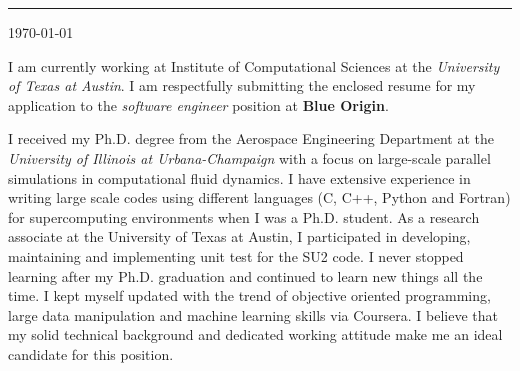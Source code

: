 \documentclass[11pt]{article}
\newcommand{\company}{\textbf{Blue Origin}}
\newcommand{\position}{\textit{software engineer }}
\begin{document}
\thispagestyle{empty}
%
%
\begin{minipage}[t]{0.45\textwidth}
\vspace{-0.5truein}
\end{minipage} 



%
%
\vspace{0.2truein}
\rule[0.8em]{\textwidth}{1.0pt} 

\noindent
\begin{minipage}[b]{0.7\textwidth}
\vspace{-0.35truein}
\noindent
\small
\begin{tabbing}
\end{tabbing}
\vspace{0pt}
\end{minipage} \hfill
\begin{minipage}[b]{0.7\textwidth}
\vspace{0pt}
\noindent
\begin{tabbing}
\today 
\end{tabbing}
\vspace{0pt}
\end{minipage} 
%
%




I am currently working at Institute of Computational Sciences at the \emph{University of Texas at Austin}.   I am respectfully submitting the enclosed resume for my application to the \position position at \company.  

I received my Ph.D. degree from the Aerospace Engineering Department at the \emph{University of Illinois at Urbana-Champaign} with a focus on large-scale parallel simulations in computational fluid dynamics.   I have extensive experience in writing large scale codes using different languages (C, C++, Python and Fortran) for supercomputing environments when I was a Ph.D. student.  As a research associate at the University of Texas at Austin, I participated in developing, maintaining and implementing unit test for the SU2 code.   I never stopped learning after my Ph.D. graduation and continued to learn new things all the time.  I kept myself updated with the trend of objective oriented programming, large data manipulation and machine learning skills via Coursera.    I believe that my solid technical background and dedicated working attitude make me an ideal candidate for this position. 
\end{document}
